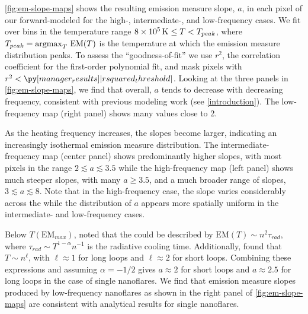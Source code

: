 \autoref{fig:em-slope-maps} shows the resulting emission measure slope, $a$, in each pixel of our forward-modeled \AR{} for the high-, intermediate-, and low-frequency cases. We fit \dem{} over bins in the temperature range $8\times10^{5}\,\textup{K}\le T< T_{peak}$, where $T_{peak}=\operatorname*{argmax}_T\,\mathrm{EM}(T)$ is the temperature at which the emission measure distribution peaks. To assess the ``goodness-of-fit'' we use $r^2$, the correlation coefficient for the first-order polynomial fit, and mask pixels with $r^2<\py[manager_results]|rsquared_threshold|$. Looking at the three panels in \autoref{fig:em-slope-maps}, we find that overall, $a$ tends to decrease with decreasing frequency, consistent with previous modeling work (see \autoref{introduction}). The low-frequency map (right panel) shows many values close to 2.

As the heating frequency increases, the slopes become larger, indicating an increasingly isothermal emission measure distribution. The intermediate-frequency map (center panel) shows predominantly higher slopes, with most pixels in the range $2\lesssim a \lesssim 3.5$ while the high-frequency map (left panel) shows much steeper slopes, with many $a\ge3.5$, and a much broader range of slopes, $3\lesssim a \lesssim 8$. Note that in the high-frequency case, the slope varies considerably across the \AR{} while the distribution of $a$ appears more spatially uniform in the intermediate- and low-frequency cases.

Below $T(\mathrm{EM}_{max})$, \citet{cargill_implications_1994} noted that the \dem{} could be described by $\mathrm{EM}(T)\sim n^2\tau_{rad}$, where $\tau_{rad}\sim T^{1-\alpha}n^{-1}$ is the radiative cooling time. Additionally, \citet{bradshaw_cooling_2010} found that $T\sim n^{\ell}$, with $\ell\approx1$ for long loops and $\ell\approx2$ for short loops. Combining these expressions and assuming $\alpha=-1/2$ \citep[i.e. using the radiative losses of][]{rosner_dynamics_1978} gives $a\approx2$ for short loops and $a\approx2.5$ for long loops in the case of single nanoflares. We find that emission measure slopes produced by low-frequency nanoflares as shown in the right panel of \autoref{fig:em-slope-maps} are consistent with analytical results for single nanoflares.

